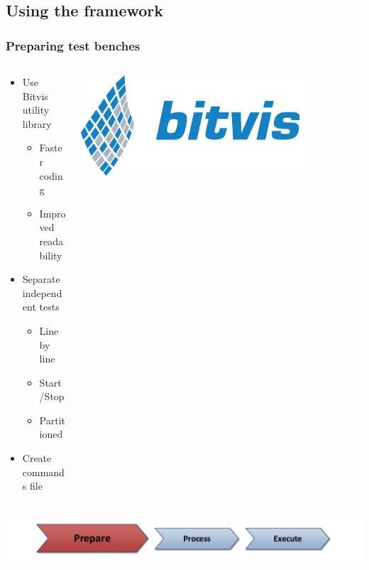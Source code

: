 \documentclass[british,10pt]{beamer}
\begin{document}
\subsection{Using the framework}
\begin{frame}\frametitle{Preparing test benches}
\vskip50pt
\begin{columns}
\begin{column}{0.6\textwidth}
\begin{itemize}
\item Use Bitvis utility library
\begin{itemize}
\item Faster coding
\item Improved readability
\end{itemize}
\item Separate independent tests
\begin{itemize}
\item Line by line
\item Start/Stop
\item Partitioned
\end{itemize}
\item Create commands file
\end{itemize}
\end{column}
\includegraphics[width=0.8\textwidth]{images/bitvis.png}
\end{columns}
\centering
\vskip50pt
\includegraphics[width=.7\textwidth]{images/ppe1.pdf}
\end{frame}
\end{document}
